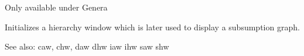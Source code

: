 
Only available under Genera

Initializes a hierarchy window which is later used to display a
subsumption graph.

See also: caw, chw, daw dhw iaw ihw saw shw

